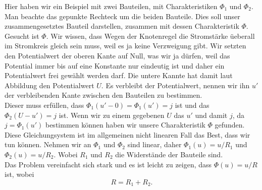 \documentclass[11pt,a4paper,leqno]{report}
\numberwithin{equation}{chapter}
\begin{document}
\noindent
Hier haben wir ein Beispiel mit zwei Bauteilen, mit Charakteristiken $\Phi_1$ und $\Phi_2$. Man beachte das gepunkte Rechteck um die beiden Bauteile. Dies soll unser zusammengesetztes Bauteil darstellen, zusammen mit dessen Charakteristik $\Phi$. Gesucht ist $\Phi$. Wir wissen, dass Wegen der Knotenregel die Stromst\"arke \"ueberall im Stromkreis gleich sein muss, weil es ja keine Verzweigung gibt. Wir setzten den Potentialwert der oberen Kante auf Null, was wir ja d\"urfen, weil das Potential immer bis auf eine Konstante nur eindeutig ist und daher ein Potentialwert frei gew\"ahlt werden darf. Die untere Kannte hat damit laut Abbildung den Potentialwert $U$. Es verbleibt der Potentialwert, nennen wir ihn $u'$ der verbleibenden Kante zwischen den Bauteilen zu bestimmen. \\Dieser muss erf\"ullen, dass $\Phi_1(u' - 0)=\Phi_1(u') = j$ ist und das $\Phi_2(U - u') = j$ ist. Wenn wir zu einem gegebenen $U$ das $u'$ und damit $j$, da $j = \Phi_1(u')$ bestimmen k\"onnen haben wir unsere Charakteristik $\Phi$ gefunden. Diese Gleichungsystem ist im allgemeinen nicht linearen Fall das Best, dass wir tun k\"onnen. Nehmen wir an $\Phi_1$ und $\Phi_2$ sind linear, daher $\Phi_1(u) = u / R_1$ und $\Phi_2(u) = u / R_2$. Wobei $R_1$ und $R_2$ die Widerst\"ande der Bauteile sind.\\
Das Problem vereinfacht sich stark und es ist leicht zu zeigen, dass $\Phi(u) = u / R$ ist, wobei 
\begin{equation}
	R = R_1 + R_2.
\end{equation}
\noindent
\end{document}
